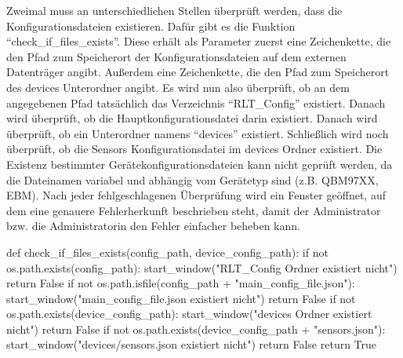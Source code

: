 Zweimal muss an unterschiedlichen Stellen überprüft werden, dass die Konfigurationsdateien existieren. Dafür gibt es die Funktion \enquote{check\_if\_files\_exists}. Diese erhält als Parameter zuerst eine Zeichenkette, die den Pfad zum Speicherort der Konfigurationsdateien auf dem externen Datenträger angibt. Außerdem eine Zeichenkette, die den Pfad zum Speicherort des devices Unterordner angibt. Es wird nun also überprüft, ob an dem angegebenen Pfad tatsächlich das Verzeichnis \enquote{RLT\_Config} existiert. Danach wird überprüft, ob die Hauptkonfigurationsdatei darin existiert. Danach wird überprüft, ob ein Unterordner namens \enquote{devices} existiert. Schließlich wird noch überprüft, ob die Sensors Konfigurationsdatei im devices Ordner existiert. Die Existenz bestimmter Gerätekonfigurationsdateien kann nicht geprüft werden, da die Dateinamen variabel und abhängig vom Gerätetyp sind (z.B. QBM97XX, EBM). Nach jeder fehlgeschlagenen Überprüfung wird ein Fenster geöffnet, auf dem eine genauere Fehlerherkunft beschrieben steht, damit der Administrator bzw. die Administratorin den Fehler einfacher beheben kann.
\begin{pythoncode}
def check_if_files_exists(config_path, device_config_path):
	if not os.path.exists(config_path):
		start_window("RLT_Config Ordner existiert nicht")
		return False
	if not os.path.isfile(config_path + "main_config_file.json"):
		start_window("main_config_file.json existiert nicht")
		return False
	if not os.path.exists(device_config_path):
		start_window("devices Ordner existiert nicht")
		return False
	if not os.path.exists(device_config_path + "sensors.json"):
		start_window("devices/sensors.json existiert nicht")
		return False
	return True
\end{pythoncode}